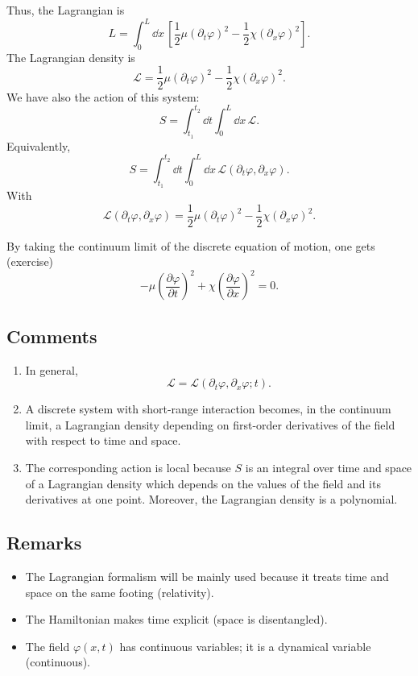 \documentclass[11pt,a4paper]{article}
\begin{document}
Thus, the Lagrangian is
\[
L=\int_0^L\dd x\,
\left[\frac12\mu(\partial_t\varphi)^2
-\frac12\chi(\partial_x\varphi)^2\right].
\]
The Lagrangian density is
\[
\mathcal L
=\frac12\mu(\partial_t\varphi)^2
-\frac12\chi(\partial_x\varphi)^2.
\]
We have also the action of this system:
\[
S=\int_{t_1}^{t_2}\dd t\int_0^L\dd x\,\mathcal L.
\]
Equivalently,
\[
S=\int_{t_1}^{t_2}\dd t\int_0^L\dd x\,
\mathcal L(\partial_t\varphi,\partial_x\varphi).
\]
With
\[
\mathcal L(\partial_t\varphi,\partial_x\varphi)
=\frac12\mu(\partial_t\varphi)^2
-\frac12\chi(\partial_x\varphi)^2.
\]

By taking the continuum limit of the discrete equation of motion, one gets (exercise)
\[
-\mu\left(\frac{\partial\varphi}{\partial t}\right)^2
+\chi\left(\frac{\partial\varphi}{\partial x}\right)^2=0.
\]

\subsection*{Comments}

\begin{enumerate}
\item In general,
\[
\mathcal L=\mathcal L(\partial_t\varphi,\partial_x\varphi;t).
\]
\item A discrete system with short-range interaction becomes, in the continuum limit, a Lagrangian density depending on first-order derivatives of the field with respect to time and space.
\item The corresponding action is local because $S$ is an integral over time and space of a Lagrangian density which depends on the values of the field and its derivatives at one point. Moreover, the Lagrangian density is a polynomial.
\end{enumerate}

\subsection*{Remarks}

\begin{itemize}
\item The Lagrangian formalism will be mainly used because it treats time and space on the same footing (relativity).

\item The Hamiltonian makes time explicit (space is disentangled).

\item The field $\varphi(x,t)$ has continuous variables; it is a dynamical variable (continuous).
\end{itemize}
\end{document}

